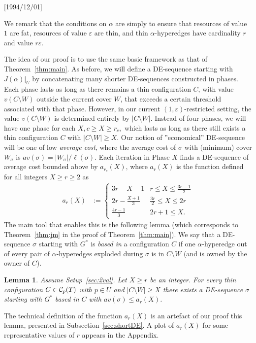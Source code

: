 \NeedsTeXFormat{LaTeX2e}[1994/12/01]\documentclass[letterpaper, 11pt]{article}
\newtheorem{lem}[thm]{Lemma}
\theoremstyle{definition}
\theoremstyle{remark}
\numberwithin{equation}{section}
\newcommand{\veps}{\varepsilon}
\begin{document}
\medskip

We remark that the conditions on $\alpha$ are simply to ensure that resources of value $1$ are fat, 
  resources of value $\veps$ are thin, and thin $\alpha$-hyperedges
  have cardinality $r$ and value $r\veps$. 

The idea of our proof is to use the same
basic framework as that of Theorem~\ref{thm:main}. As before, we will
define a DE-sequence starting with $J(\alpha)|_U$ by concatenating
many shorter DE-sequences constructed in
phases. Each phase lasts as long as there remains a thin
configuration $C$, with value $v(C\setminus W)$ outside the current
cover $W$, that exceeds a certain threshold associated with that phase. 
However, in our current $(1,\varepsilon)$-restricted setting, the
value $v(C\setminus W)$ is determined entirely by $|C\setminus
W|$. Instead of four phases, we will have one phase for each $X, c\geq
X \geq r_c,$ which lasts as long as there still exists a thin
configuration $C$ with $|C\setminus W| \geq X$. Our notion of
''economical'' DE-sequence will be one of low {\em average cost},
where the average cost of $\sigma$ with (minimum) cover $W_{\sigma}$ is
$av(\sigma)=|W_{\sigma}|/\ell(\sigma)$.  
Each iteration in Phase $X$ finds a DE-sequence of average cost
bounded above by $a_{r_c}(X)$, where
$a_r(X)$ is the function defined for all integers $X\geq r\geq 2$ as 
\begin{align*} 
a_r(X) & := \left\{
            \begin{array}{ll}
              3r-X-1 & r \leq X \leq \frac{3r-1}{2} \\
  2r- \frac{X+1}{3} & \frac{3r}{2} \leq X \leq 2r \\
  \frac{4r-1}{3} & 2r+1 \leq X.
\end{array}
                   \right.
                   \end{align*}
The main tool that enables this is the following lemma (which
corresponds to Theorem~\ref{thm:jm} in the proof of
Theorem~\ref{thm:main}).
We say that a DE-sequence $\sigma$ starting with $G^*$ is {\it
  based in} a 
configuration $C$ if one $\alpha$-hyperedge out of every pair of $\alpha$-hyperedges exploded
during $\sigma$ is in $C\setminus W$ (and is owned by the owner of $C$).

\begin{lem}\label{lem:basedinC}
Assume Setup~\ref{sec:2val}. 
Let $X\geq r$ be an integer. For every thin configuration $C\in {\cal
  C}_p(T)$ with 
  $p\in U$ and $|C\setminus W| \geq X$
there exists a DE-sequence $\sigma$ starting with $G^*$ based in $C$
with  $av(\sigma)\leq a_r(X)$.
\end{lem}
 The technical definition of the function $a_r(X)$ is an artefact of our proof this lemma, presented in Subsection~\ref{sec:shortDE}. A plot of $a_r(X)$ for some representative values of $r$ appears in the Appendix.
\end{document}
